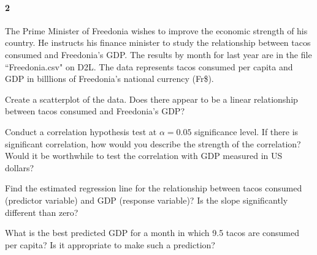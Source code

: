 \documentclass{article}
\begin{document}
\begin{flushleft}
\paragraph{2} The Prime Minister of Freedonia wishes to improve the economic strength of his country. He instructs his finance minister to study the relationship between tacos consumed and Freedonia's GDP. The results by month for last year are in the file ``Freedonia.csv" on D2L. The data represents tacos consumed per capita and GDP in billlions of Freedonia's national currency (Fr\$).
\begin{enumalpha}
\item Create a scatterplot of the data. Does there appear to be a linear relationship between tacos consumed and Freedonia's GDP?
\vspace{1.6in}
\item Conduct a correlation hypothesis test at $\alpha = 0.05$ significance level. If there is significant correlation, how would you describe the strength of the correlation? Would it be worthwhile to test the correlation with GDP measured in US dollars?
\vspace{1.6in}
\item Find the estimated regression line for the relationship between tacos consumed (predictor variable) and GDP (response variable)? Is the slope significantly different than zero?
\vspace{1.6in}
\item What is the best predicted GDP for a month in which 9.5 tacos are consumed per capita? Is it appropriate to make such a prediction?
\end{enumalpha}

\newpage

\end{flushleft}
\end{document}
